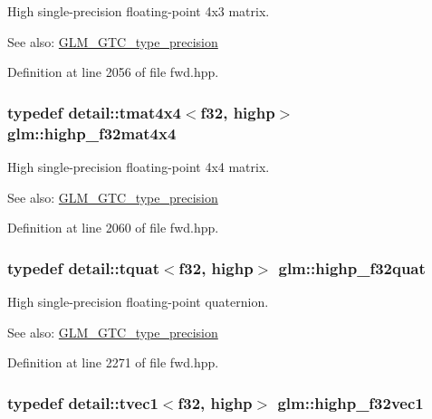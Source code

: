 High single-precision floating-point 4x3 matrix. \begin{Desc}
\item[See also:]\hyperlink{group__gtc__type__precision}{GLM\_\-GTC\_\-type\_\-precision} \end{Desc}


Definition at line 2056 of file fwd.hpp.\hypertarget{group__gtc__type__precision_gfe24f12e4f5453058caea3f583ad7d9c}{
\subsubsection[highp\_\-f32mat4x4]{\setlength{\rightskip}{0pt plus 5cm}typedef detail::tmat4x4$<$f32, highp$>$ {\bf glm::highp\_\-f32mat4x4}}}
\label{group__gtc__type__precision_gfe24f12e4f5453058caea3f583ad7d9c}


High single-precision floating-point 4x4 matrix. \begin{Desc}
\item[See also:]\hyperlink{group__gtc__type__precision}{GLM\_\-GTC\_\-type\_\-precision} \end{Desc}


Definition at line 2060 of file fwd.hpp.\hypertarget{group__gtc__type__precision_g26eef27d2efbd759e7e93c40672402e9}{
\subsubsection[highp\_\-f32quat]{\setlength{\rightskip}{0pt plus 5cm}typedef detail::tquat$<$f32, highp$>$ {\bf glm::highp\_\-f32quat}}}
\label{group__gtc__type__precision_g26eef27d2efbd759e7e93c40672402e9}


High single-precision floating-point quaternion. \begin{Desc}
\item[See also:]\hyperlink{group__gtc__type__precision}{GLM\_\-GTC\_\-type\_\-precision} \end{Desc}


Definition at line 2271 of file fwd.hpp.\hypertarget{group__gtc__type__precision_gc8be8ce31b9df0a5005d7c7458a3d03e}{
\subsubsection[highp\_\-f32vec1]{\setlength{\rightskip}{0pt plus 5cm}typedef detail::tvec1$<$f32, highp$>$ {\bf glm::highp\_\-f32vec1}}}
\label{group__gtc__type__precision_gc8be8ce31b9df0a5005d7c7458a3d03e}


